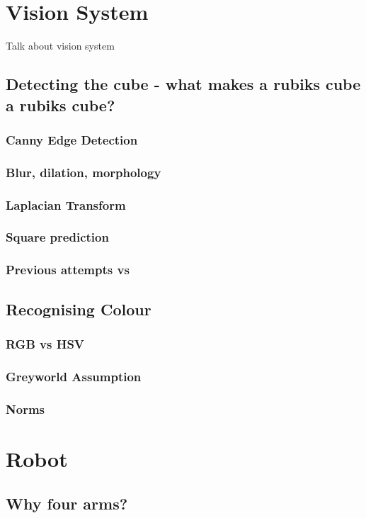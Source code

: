 \documentclass[titlepage]{report}[12pt]
\begin{document}
\section{Vision System}
Talk about vision system
\subsection{Detecting the cube - what makes a rubiks cube a rubiks cube?}
\subsubsection{Canny Edge Detection}
\subsubsection{Blur, dilation, morphology}
\subsubsection{Laplacian Transform}
\subsubsection{Square prediction}
\subsubsection{Previous attempts vs}

\subsection{Recognising Colour}
\subsubsection{RGB vs HSV}
\subsubsection{Greyworld Assumption}
\subsubsection{Norms}

\section{Robot}
\subsection{Why four arms?}
\end{document}

